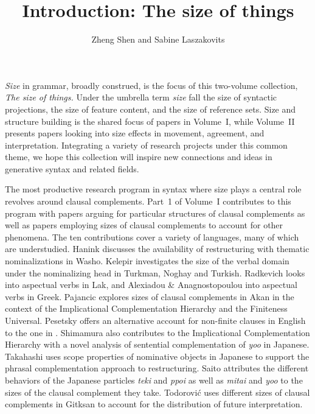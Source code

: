 \documentclass[output=paper]{langscibook}
\author{Zheng Shen\affiliation{National University of Singapore} and Sabine Laszakovits\affiliation{Austrian Academy of Sciences; University of Connecticut}}
\title{Introduction: The size of things}
\begin{document}
\maketitle

\noindent\textit{Size} in grammar, broadly construed, is the focus of this two-volume collection, \textit{The size of things.}
Under the umbrella term \textit{size} fall the size of syntactic projections, the size of feature content, and the size of  reference sets. 
Size and structure building is the shared focus of papers in Volume~I, while Volume~II presents papers looking into size effects in movement, agreement, and interpretation. 
Integrating a variety of research projects under this common theme, we hope this collection will inspire new connections and ideas in generative syntax and related fields. 

The most productive research program in syntax where size plays a central role revolves around clausal complements. 
Part~1 of Volume~I contributes to this program with papers arguing for particular structures of clausal complements as well as papers employing sizes of clausal complements to account for other phenomena. 
The ten contributions cover a variety of languages, many of which are understudied. 
Hanink discusses the availability of restructuring with thematic nominalizations in Washo. 
Kelepir investigates the size of the verbal domain under the nominalizing head in Turkman, Noghay and Turkish. 
Radkevich looks into aspectual verbs in Lak, and Alexiadou \& Anagnostopoulou into aspectual verbs in Greek.
Pajancic explores sizes of clausal complements in Akan in the context of the Implicational Complementation Hierarchy and the Finiteness Universal. 
Pesetsky offers an alternative account for non-finite clauses in English to the one in \cite{Wurmbrand:2014}.
Shimamura also contributes to the Implicational Complementation Hierarchy with a novel analysis of sentential complementation of \textit{yoo} in Japanese. 
Takahashi uses scope properties of nominative objects in Japanese to support the phrasal complementation approach to restructuring. 
Saito attributes the different behaviors of the Japanese particles \textit{teki} and \textit{ppoi} as well as \textit{mitai} and \textit{yoo} to the sizes of the clausal complement they take.
Todorović uses different sizes of clausal complements in Gitksan to account for the distribution of future interpretation. 
\end{document}
